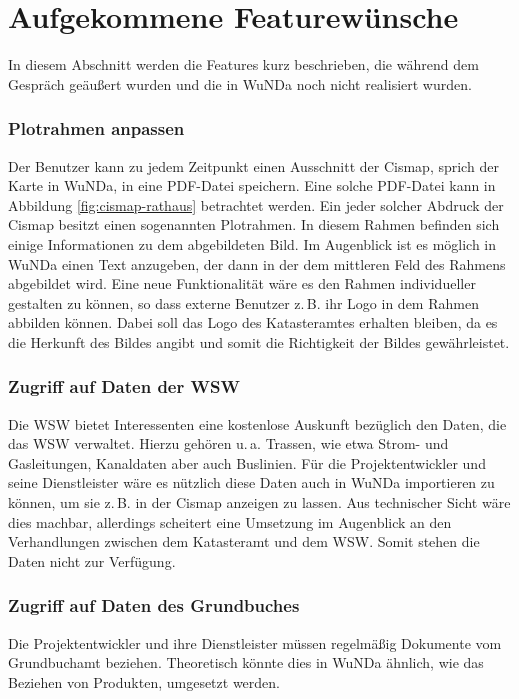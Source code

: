 \section{Aufgekommene Featurewünsche}
In diesem Abschnitt werden die Features kurz beschrieben, die während dem Gespräch geäußert wurden und die in \ac{WuNDa} noch nicht realisiert wurden.

\subsubsection{Plotrahmen anpassen}
Der Benutzer kann zu jedem Zeitpunkt einen Ausschnitt der Cismap, sprich der Karte in \ac{WuNDa}, in eine PDF-Datei speichern.
Eine solche PDF-Datei kann in Abbildung \vref{fig:cismap-rathaus} betrachtet werden.
Ein jeder solcher Abdruck der Cismap besitzt einen sogenannten Plotrahmen. In diesem Rahmen befinden sich einige Informationen zu dem abgebildeten Bild.
Im Augenblick ist es möglich in \ac{WuNDa} einen Text anzugeben, der dann in der dem mittleren Feld des Rahmens abgebildet wird.
Eine neue Funktionalität wäre es den Rahmen individueller gestalten zu können, so dass externe Benutzer z.\,B. ihr Logo in dem Rahmen abbilden können.
Dabei soll das Logo des Katasteramtes erhalten bleiben, da es die Herkunft des Bildes angibt und somit die Richtigkeit der Bildes gewährleistet. 

\subsubsection{Zugriff auf Daten der WSW}
Die \ac{WSW} bietet Interessenten eine kostenlose Auskunft bezüglich den Daten, die das \ac{WSW} verwaltet.
Hierzu gehören u.\,a. Trassen, wie etwa Strom- und Gasleitungen, Kanaldaten aber auch Buslinien.
Für die Projektentwickler und seine Dienstleister wäre es nützlich diese Daten auch in \ac{WuNDa} importieren zu können, um sie z.\,B. in der Cismap anzeigen zu lassen.
Aus technischer Sicht wäre dies machbar, allerdings scheitert eine Umsetzung  im Augenblick an den Verhandlungen zwischen dem Katasteramt und dem \ac{WSW}.
Somit stehen die Daten nicht zur Verfügung.
\subsubsection{Zugriff auf Daten des Grundbuches}
Die Projektentwickler und ihre Dienstleister müssen regelmäßig Dokumente vom Grundbuchamt beziehen.
Theoretisch könnte dies in \ac{WuNDa} ähnlich, wie das Beziehen von Produkten, umgesetzt werden.

